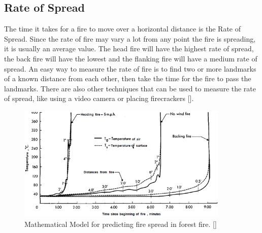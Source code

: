 \subsection{Rate of Spread}
The time it takes for a fire to move over a horizontal distance is the Rate of Spread. Since the rate of fire may vary a lot from any point the fire is spreading, it is usually an average value. The head fire will have the highest rate of spread, the back fire will have the lowest and the flanking fire will have a medium rate of spread. An easy way to measure the rate of fire is to find two or more landmarks of a known distance from each other, then take the time for the fire to pass the landmarks. There are also other techniques that can be used to measure the rate of spread, like using a video camera or placing firecrackers [].
\begin{figure}[here]
  \centering
      \includegraphics[width=0.9\textwidth]{theory/graphics/fire-prediction.jpg}
  \caption{Mathematical Model for predicting fire spread in forest fire. [] }
  \label{fig:fire-prediction}
\end{figure}

